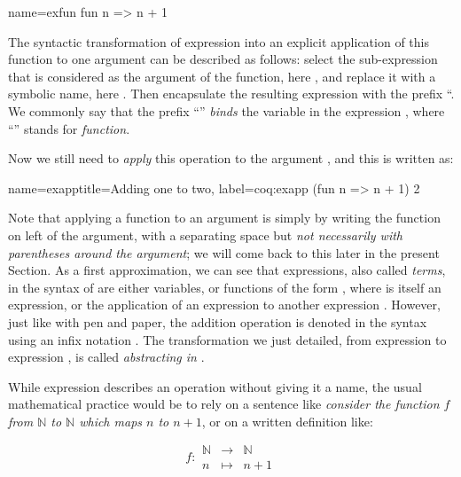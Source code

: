 \begin{coq}{name=exfun}{}
  fun n => n + 1
\end{coq}
The syntactic transformation of expression  into an
explicit application of this function to one argument can be
described as follows: select the sub-expression that is considered as
the argument of the function, here , and replace it with a
symbolic name, here . Then encapsulate the resulting expression
 with the prefix ``. We commonly
say that the prefix ``'' \emph{binds} the variable  in the
expression , where ``'' stands for
\emph{function}.

Now we still need to \emph{apply} this operation to the argument
, and this is written as:

\begin{coq}{name=exapp}{title=Adding one to two, label=coq:exapp}
  (fun n => n + 1) 2
\end{coq}
Note that applying a function to an argument is simply by writing the
function on left of the argument, with a separating space but {\em not
  necessarily with parentheses around the argument}; we will come back to this
later in the present Section. As a first approximation, we can see
that expressions, also called \emph{terms}, in the syntax of \Coq{}
are either variables, or
functions of the form , where  is itself an
expression, or the application  of an expression  to
another expression . However, just like with pen and paper, the addition
operation is denoted in the \Coq{} syntax using an infix notation \C{+}.
The transformation we just detailed, from expression  to expression
, is called \emph{abstracting  in  }.

While expression  describes an operation
without giving it a name, the usual mathematical practice would be to
rely on a sentence like {\em consider the function \(f\) from {\(\mathbb{N}\)}
to {\(\mathbb{N}\)} which maps \(n\) to \(n + 1\)}, or on a written
definition like:

\begin{equation}\label{equation:f}
f :
\begin{array}{ccc}
{\mathbb{N}} &\rightarrow& {\mathbb{N}}\\
n &\mapsto& n + 1
\end{array}
\end{equation}

